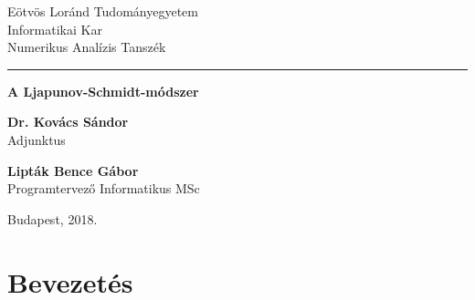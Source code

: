 \documentclass[oneside, titlepage, 12pt, a4paper]{report}
\begin{document}
\begin{titlepage}

\begin{minipage}{0.40\linewidth}
\end{minipage}
\begin{minipage}{0.50\linewidth}
\begin{center}
Eötvös Loránd Tudományegyetem \\
Informatikai Kar \\
Numerikus Analízis Tanszék
\end{center}
\end{minipage}

\hrule
\vfill

\begin{center}
\Huge
\textbf{A Ljapunov-Schmidt-módszer}
\normalsize
\end{center}

\vfill

\begin{minipage}[t]{0.5\linewidth}
\begin{flushleft}
\textbf{Dr. Kovács Sándor} \\
Adjunktus
\end{flushleft}
\end{minipage}
\begin{minipage}[t]{0.5\linewidth}
\begin{flushright}
\textbf{Lipták Bence Gábor} \\
Programtervező Informatikus MSc
\end{flushright}
\end{minipage}

\vfill

\begin{center}
Budapest, 2018.
\end{center}

\end{titlepage}

\tableofcontents


\onehalfspacing
\chapter{Bevezetés}
\label{chap:Introduction}


\end{document}
